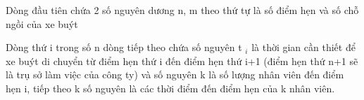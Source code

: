 Dòng đầu tiên chứa 2 số nguyên dương n, m theo thứ tự là số điểm hẹn và số chỗ ngồi của xe buýt  

   Dòng thứ i trong số n dòng tiếp theo chứa số nguyên t   $_    i   $   là thời gian cần thiết để xe buýt di chuyển từ điểm hẹn thứ i đến điểm hẹn thứ   i+1 (điểm hẹn thứ n+1 sẽ là trụ sở làm việc của công ty) và số nguyên k là số lượng nhân viên đến điểm hẹn i, tiếp theo k số nguyên là các thời điểm đến   điểm hẹn của k nhân viên.